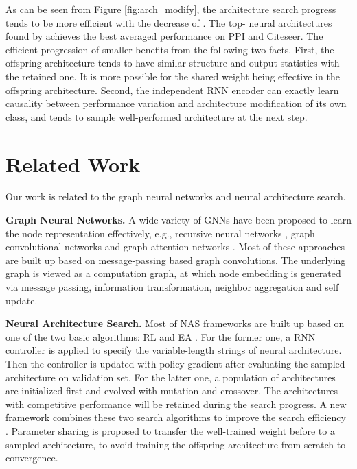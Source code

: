 \documentclass[sigconf]{acmart}
\begin{document}
As can be seen from Figure \ref{fig:arch_modify}, the architecture search progress tends to be more efficient with the decrease of . The top- neural architectures found by  achieves the best averaged performance on PPI and Citeseer. The efficient progression of smaller  benefits from the following two facts. First, the offspring architecture tends to have similar structure and output statistics with the retained one. It is more possible for the shared weight being effective in the offspring architecture. Second, the independent RNN encoder can exactly learn causality between performance variation and architecture modification of its own class, and tends to sample well-performed architecture at the next step. 

\section{Related Work}
Our work is related to the graph neural networks and neural architecture search.

\textbf{Graph Neural Networks.} A wide variety of GNNs have been proposed to learn the node representation effectively, e.g., recursive neural networks \cite{gori2005new, scarselli2009graph}, graph convolutional networks \cite{bruna2013spectral, defferrard2016convolutional, kipf2016semi, hamilton2017inductive, gao2018large} and graph attention networks \cite{velickovic2017graph,vaswani2017attention}. Most of these approaches are built up based on message-passing based graph convolutions. The underlying graph is viewed as a computation graph, at which node embedding is generated via message passing, information transformation, neighbor aggregation and self update. 


\textbf{Neural Architecture Search.} Most of NAS frameworks are built up based on one of the two basic algorithms: RL \cite{zoph2016neural, zoph2018learning, pham2018efficient, cai2017reinforcement, baker2016designing} and EA \cite{liu2017hierarchical, real2017large, miikkulainen2019evolving, xie2017genetic, real2019regularized}. For the former one, a RNN controller is applied to specify the variable-length strings of neural architecture. Then the controller is updated with policy gradient after evaluating the sampled architecture on validation set. For the latter one, a population of architectures are initialized first and evolved with mutation and crossover. The architectures with competitive performance will be retained during the search progress. A new framework combines these two search algorithms to improve the search efficiency \cite{chen2018reinforced}. Parameter sharing \cite{pham2018efficient} is proposed to transfer the well-trained weight before to a sampled architecture, to avoid training the offspring architecture from scratch to convergence. 
\end{document}
